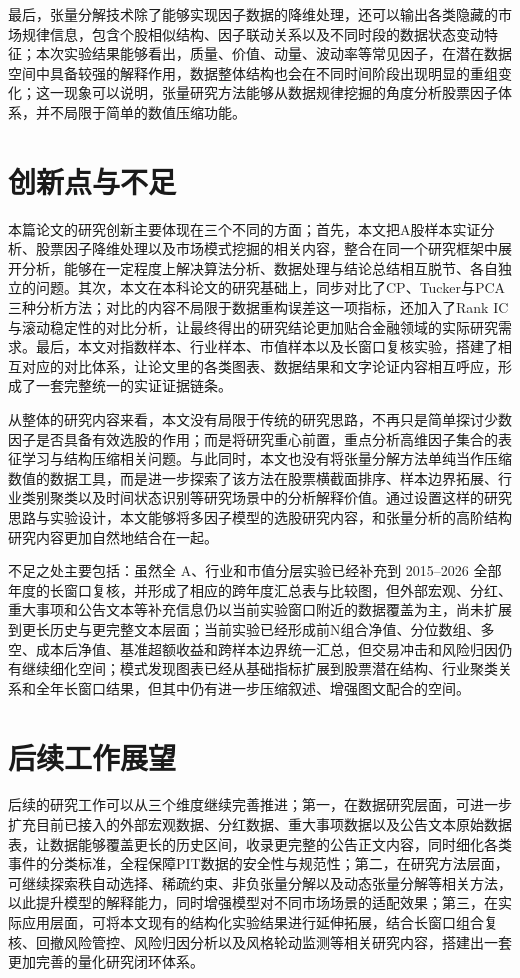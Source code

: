 最后，张量分解技术除了能够实现因子数据的降维处理，还可以输出各类隐藏的市场规律信息，包含个股相似结构、因子联动关系以及不同时段的数据状态变动特征；本次实验结果能够看出，质量、价值、动量、波动率等常见因子，在潜在数据空间中具备较强的解释作用，数据整体结构也会在不同时间阶段出现明显的重组变化；这一现象可以说明，张量研究方法能够从数据规律挖掘的角度分析股票因子体系，并不局限于简单的数值压缩功能。

\section{创新点与不足}

本篇论文的研究创新主要体现在三个不同的方面；首先，本文把A股样本实证分析、股票因子降维处理以及市场模式挖掘的相关内容，整合在同一个研究框架中展开分析，能够在一定程度上解决算法分析、数据处理与结论总结相互脱节、各自独立的问题。其次，本文在本科论文的研究基础上，同步对比了CP、Tucker与PCA三种分析方法；对比的内容不局限于数据重构误差这一项指标，还加入了Rank IC与滚动稳定性的对比分析，让最终得出的研究结论更加贴合金融领域的实际研究需求。最后，本文对指数样本、行业样本、市值样本以及长窗口复核实验，搭建了相互对应的对比体系，让论文里的各类图表、数据结果和文字论证内容相互呼应，形成了一套完整统一的实证证据链条。

从整体的研究内容来看，本文没有局限于传统的研究思路，不再只是简单探讨少数因子是否具备有效选股的作用；而是将研究重心前置，重点分析高维因子集合的表征学习与结构压缩相关问题。与此同时，本文也没有将张量分解方法单纯当作压缩数值的数据工具，而是进一步探索了该方法在股票横截面排序、样本边界拓展、行业类别聚类以及时间状态识别等研究场景中的分析解释价值。通过设置这样的研究思路与实验设计，本文能够将多因子模型的选股研究内容，和张量分析的高阶结构研究内容更加自然地结合在一起。

不足之处主要包括：虽然全 A、行业和市值分层实验已经补充到 2015--2026 全部年度的长窗口复核，并形成了相应的跨年度汇总表与比较图，但外部宏观、分红、重大事项和公告文本等补充信息仍以当前实验窗口附近的数据覆盖为主，尚未扩展到更长历史与更完整文本层面；当前实验已经形成前N组合净值、分位数组、多空、成本后净值、基准超额收益和跨样本边界统一汇总，但交易冲击和风险归因仍有继续细化空间；模式发现图表已经从基础指标扩展到股票潜在结构、行业聚类关系和全年长窗口结果，但其中仍有进一步压缩叙述、增强图文配合的空间。

\section{后续工作展望}

后续的研究工作可以从三个维度继续完善推进；第一，在数据研究层面，可进一步扩充目前已接入的外部宏观数据、分红数据、重大事项数据以及公告文本原始数据表，让数据能够覆盖更长的历史区间，收录更完整的公告正文内容，同时细化各类事件的分类标准，全程保障PIT数据的安全性与规范性；第二，在研究方法层面，可继续探索秩自动选择、稀疏约束、非负张量分解以及动态张量分解等相关方法，以此提升模型的解释能力，同时增强模型对不同市场场景的适配效果；第三，在实际应用层面，可将本文现有的结构化实验结果进行延伸拓展，结合长窗口组合复核、回撤风险管控、风险归因分析以及风格轮动监测等相关研究内容，搭建出一套更加完善的量化研究闭环体系。

